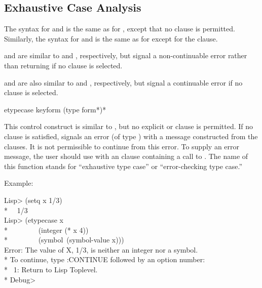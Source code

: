\subsection{Exhaustive Case Analysis}
\label{EXHAUSTIVE-CASE-ANALYSIS-CONDITIONS}


The syntax for  and  is the same as for
, except that no  clause is permitted. Similarly,
the syntax for  and  is the same as for  except
for the  clause.

 and  are similar to  and ,
respectively, but signal a non-continuable error rather than returning 
if no clause is selected.

 and  are also similar to  and
, respectively, but signal a continuable error if no clause is
selected.

\begin{defmac}
etypecase keyform {(type {form}*)}*

This control construct is similar to , but no explicit
 or  clause is permitted. If no clause is satisfied,
 signals an error (of type ) with a message
constructed from the clauses.  It is not permissible to continue from this
error. To supply an error message, the user should use  with an
 clause containing a call to . The name of this
function stands for ``exhaustive type case'' or ``error-checking type case.''

Example:
\begin{lisp}
Lisp> (setq x 1/3) \\*
~\EV\ 1/3 \\
Lisp> (etypecase x \\*
~~~~~~~~(integer (* x 4)) \\*
~~~~~~~~(symbol~(symbol-value x))) \\
Error: The value of X, 1/3, is neither an integer nor a symbol. \\*
To continue, type :CONTINUE followed by an option number: \\*
~1: Return to Lisp Toplevel. \\*
Debug>
\end{lisp}
\end{defmac}

